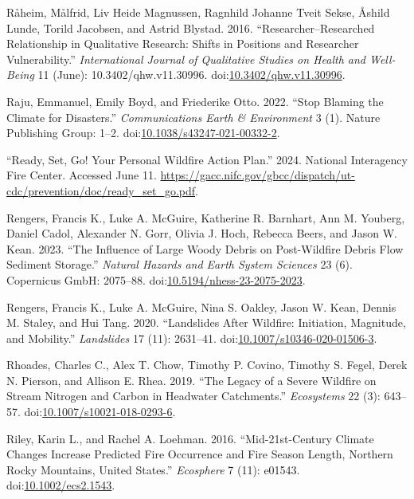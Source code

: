 \documentclass[
]{article}
\newlength{\cslhangindent}
\newenvironment{CSLReferences}[2] %
 {\begin{list}{}{%
  \setlength{\itemindent}{0pt}
  \setlength{\leftmargin}{0pt}
  \setlength{\parsep}{0pt}
  \ifodd #1
   \setlength{\leftmargin}{\cslhangindent}
   \setlength{\itemindent}{-1\cslhangindent}
  \fi
  \setlength{\itemsep}{#2\baselineskip}}}
 {\end{list}}
\begin{document}
\begin{CSLReferences}{1}{0}
Råheim, Målfrid, Liv Heide Magnussen, Ragnhild Johanne Tveit Sekse, Åshild Lunde, Torild Jacobsen, and Astrid Blystad. 2016. {``Researcher--Researched Relationship in Qualitative Research: {Shifts} in Positions and Researcher Vulnerability.''} \emph{International Journal of Qualitative Studies on Health and Well-Being} 11 (June): 10.3402/qhw.v11.30996. doi:\href{https://doi.org/10.3402/qhw.v11.30996}{10.3402/qhw.v11.30996}.

Raju, Emmanuel, Emily Boyd, and Friederike Otto. 2022. {``Stop Blaming the Climate for Disasters.''} \emph{Communications Earth \& Environment} 3 (1). Nature Publishing Group: 1--2. doi:\href{https://doi.org/10.1038/s43247-021-00332-2}{10.1038/s43247-021-00332-2}.

{``Ready, {Set}, {Go}! {Your Personal Wildfire Action Plan}.''} 2024. National Interagency Fire Center. Accessed June 11. \url{https://gacc.nifc.gov/gbcc/dispatch/ut-cdc/prevention/doc/ready_set_go.pdf}.

Rengers, Francis K., Luke A. McGuire, Katherine R. Barnhart, Ann M. Youberg, Daniel Cadol, Alexander N. Gorr, Olivia J. Hoch, Rebecca Beers, and Jason W. Kean. 2023. {``The Influence of Large Woody Debris on Post-Wildfire Debris Flow Sediment Storage.''} \emph{Natural Hazards and Earth System Sciences} 23 (6). Copernicus GmbH: 2075--88. doi:\href{https://doi.org/10.5194/nhess-23-2075-2023}{10.5194/nhess-23-2075-2023}.

Rengers, Francis K., Luke A. McGuire, Nina S. Oakley, Jason W. Kean, Dennis M. Staley, and Hui Tang. 2020. {``Landslides After Wildfire: Initiation, Magnitude, and Mobility.''} \emph{Landslides} 17 (11): 2631--41. doi:\href{https://doi.org/10.1007/s10346-020-01506-3}{10.1007/s10346-020-01506-3}.

Rhoades, Charles C., Alex T. Chow, Timothy P. Covino, Timothy S. Fegel, Derek N. Pierson, and Allison E. Rhea. 2019. {``The {Legacy} of a {Severe Wildfire} on {Stream Nitrogen} and {Carbon} in {Headwater Catchments}.''} \emph{Ecosystems} 22 (3): 643--57. doi:\href{https://doi.org/10.1007/s10021-018-0293-6}{10.1007/s10021-018-0293-6}.

Riley, Karin L., and Rachel A. Loehman. 2016. {``Mid-21st-Century Climate Changes Increase Predicted Fire Occurrence and Fire Season Length, {Northern Rocky Mountains}, {United States}.''} \emph{Ecosphere} 7 (11): e01543. doi:\href{https://doi.org/10.1002/ecs2.1543}{10.1002/ecs2.1543}.


\end{CSLReferences}
\end{document}
